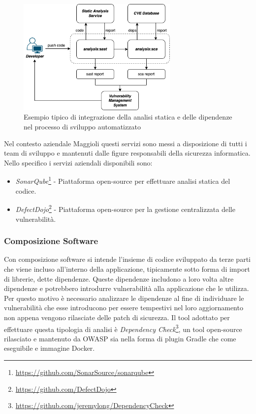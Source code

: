 \begin{figure}[H]
\centering
\includegraphics[width=0.7\textwidth]{img/tesi-12-sastsca.drawio.png}
\caption{Esempio tipico di integrazione della analisi statica e delle dipendenze nel processo di sviluppo automatizzato}
\end{figure}

Nel contesto aziendale Maggioli questi servizi sono messi a disposizione di tutti i team di sviluppo e mantenuti dalle figure responsabili della sicurezza informatica. Nello specifico i servizi aziendali disponibili sono:
\begin{itemize}
    \item \textit{SonarQube}\footnote{\url{https://github.com/SonarSource/sonarqube}} - Piattaforma open-source per effettuare analisi statica del codice.
    \item \textit{DefectDojo}\footnote{\url{https://github.com/DefectDojo}} - Piattaforma open-source per la gestione centralizzata delle vulnerabilità.
\end{itemize}

\subsubsection{Composizione Software}
Con composizione software si intende l'insieme di codice sviluppato da terze parti che viene incluso all'interno della applicazione, tipicamente sotto forma di import di librerie, dette dipendenze. Queste dipendenze includono a loro volta altre dipendenze e potrebbero introdurre vulnerabilità alla applicazione che le utilizza. \\
Per questo motivo è necessario analizzare le dipendenze al fine di individuare le vulnerabilità che esse introducono per essere tempestivi nel loro aggiornamento non appena vengono rilasciate delle patch di sicurezza. Il tool adottato per effettuare questa tipologia di analisi è \textit{Dependency Check}\footnote{\url{https://github.com/jeremylong/DependencyCheck}}, un tool open-source rilasciato e mantenuto da OWASP sia nella forma di plugin Gradle che come eseguibile e immagine Docker.

